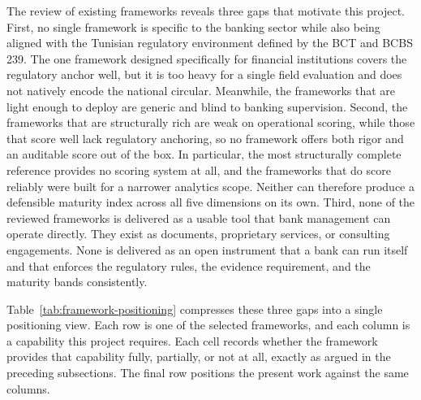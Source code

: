 The review of existing frameworks reveals three gaps that motivate this project. First, no single framework is specific to the banking sector while also being aligned with the Tunisian regulatory environment defined by the BCT and BCBS 239. The one framework designed specifically for financial institutions covers the regulatory anchor well, but it is too heavy for a single field evaluation and does not natively encode the national circular. Meanwhile, the frameworks that are light enough to deploy are generic and blind to banking supervision. Second, the frameworks that are structurally rich are weak on operational scoring, while those that score well lack regulatory anchoring, so no framework offers both rigor and an auditable score out of the box. In particular, the most structurally complete reference provides no scoring system at all, and the frameworks that do score reliably were built for a narrower analytics scope. Neither can therefore produce a defensible maturity index across all five dimensions on its own. Third, none of the reviewed frameworks is delivered as a usable tool that bank management can operate directly. They exist as documents, proprietary services, or consulting engagements. None is delivered as an open instrument that a bank can run itself and that enforces the regulatory rules, the evidence requirement, and the maturity bands consistently.

Table~\ref{tab:framework-positioning} compresses these three gaps into a single positioning view. Each row is one of the selected frameworks, and each column is a capability this project requires. Each cell records whether the framework provides that capability fully, partially, or not at all, exactly as argued in the preceding subsections. The final row positions the present work against the same columns.

